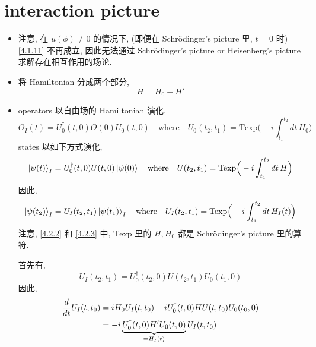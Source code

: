 \section{interaction picture}
\begin{itemize}
	\item 注意, 在 $u(\phi) \neq 0$ 的情况下, (即便在 Schrödinger's picture 里, $t = 0$ 时) \eqref{4.1.11} 不再成立, 因此无法通过 Schrödinger's picture or Heisenberg's picture 求解存在相互作用的场论.
	
	\item 将 Hamiltonian 分成两个部分,
	\begin{equation}
		H = H_0 + H'
	\end{equation}
	
	\item operators 以自由场的 Hamiltonian 演化,
	\begin{equation} \label{4.2.2}
		O_I(t) = U_0^\dag(t, 0) O(0) U_0(t, 0) \quad \text{where} \quad U_0(t_2, t_1) = \mathrm{Texp} \Big( - i \int_{t_1}^{t_2} dt \, H_0 \Big)
	\end{equation}
	states 以如下方式演化,
	\begin{equation} \label{4.2.3}
		\ket{\psi(t)}_I = U_0^\dag(t, 0) U(t, 0) \ket{\psi(0)} \quad \text{where} \quad U(t_2, t_1) = \mathrm{Texp} \Big( - i \int_{t_1}^{t_2} dt \, H \Big)
	\end{equation}
	因此,
	\begin{equation}
		\ket{\psi(t_2)}_I = U_I(t_2, t_1) \ket{\psi(t_1)}_I \quad \text{where} \quad U_I(t_2, t_1) = \mathrm{Texp} \Big( - i \int_{t_1}^{t_2} dt \, H_I(t) \Big)
	\end{equation}
	注意, \eqref{4.2.2} 和 \eqref{4.2.3} 中, $\mathrm{Texp}$ 里的 $H, H_0$ 都是 Schrödinger's picture 里的算符.
	
	\begin{tcolorbox}[title=calculation:]
		首先有,
		\begin{equation}
			U_I(t_2, t_1) = U_0^\dag(t_2, 0) U(t_2, t_1) U_0(t_1, 0)
		\end{equation}
		因此,
		\begin{align}
			\frac{d}{dt} U_I(t, t_0) &= i H_0 U_I(t, t_0) - i U_0^\dag(t, 0) H U(t, t_0) U_0(t_0, 0) \notag \\
			&= - i \underbrace{U_0^\dag(t, 0) H' U_0(t, 0)}_{= H_I(t)} U_I(t, t_0)
		\end{align}
	\end{tcolorbox}
\end{itemize}

